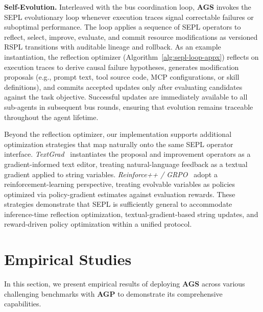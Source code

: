 \documentclass{article}
\theoremstyle{plain}
\theoremstyle{definition}
\theoremstyle{remark}
\newcommand{\projectname}{\textbf{\textsc{AGP}}\xspace}
\newcommand{\projectnameAgent}{\textbf{\textsc{AGS}}\xspace}
\begin{document}
\textbf{Self-Evolution.} Interleaved with the bus coordination loop, \projectnameAgent invokes the SEPL evolutionary loop whenever execution traces signal correctable failures or suboptimal performance. The loop applies a sequence of SEPL operators to reflect, select,  improve, evaluate, and commit resource modifications as versioned RSPL transitions with auditable lineage and rollback. As an example instantiation, the reflection optimizer (Algorithm~\ref{alg:sepl-loop-appx}) reflects on execution traces to derive causal failure hypotheses, generates modification proposals (e.g., prompt text, tool source code, MCP configurations, or skill definitions), and commits accepted updates only after evaluating candidates against the task objective. Successful updates are immediately available to all sub-agents in subsequent bus rounds, ensuring that evolution remains traceable throughout the agent lifetime.

Beyond the reflection optimizer, our implementation supports additional optimization strategies that map naturally onto the same SEPL operator interface. \emph{TextGrad}~\citep{yuksekgonul2025optimizing} instantiates the proposal and improvement operators as a gradient-informed text editor, treating natural-language feedback as a textual gradient applied to string variables. \emph{Reinforce++ / GRPO}~\citep{hu2025reinforce++,shao2024deepseekmath, ouyang2022training, ziegler2019fine, schulman2017proximal} adopt a reinforcement-learning perspective, treating evolvable variables as policies optimized via policy-gradient estimates against evaluation rewards. These strategies demonstrate that SEPL is sufficiently general to accommodate inference-time reflection optimization, textual-gradient-based string updates, and reward-driven policy optimization within a unified protocol.

\vspace{-0.3cm}
\section{Empirical Studies}
\vspace{-0.2cm}

In this section, we present empirical results of deploying \projectnameAgent across various challenging benchmarks with \projectname to demonstrate its comprehensive capabilities.
\end{document}
